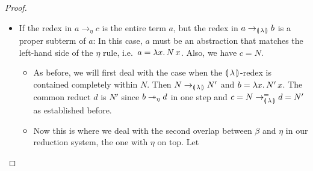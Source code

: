 \begin{proof}
\begin{itemize}
\begin{itemize}
\begin{itemize}
        $a = \ap{(\lam{x}{\ap{T}{x}})}{N}$. Performing the $\eta$-reduction
        yields $c = \ap{T}{N}$. In this case, both $b$ and $c$ are equal to
        $\ap{T}{N}$ and so we can choose $\ap{T}{N}$ as our $d$.
      \end{itemize}
    \item If $a$ is any other kind of term: Let $l \to r$ be the rule used
      in $a \to_{\calc} b$. Not counting $\beta$, which only acts on
      applications and which we dealt with just above, the rules of
      $\banana{\lambda}$ do not overlap with the $\eta$ rule. This
      means the $\eta$-redex which led to $c$ must lie entirely inside a
      part the part of $l$ which corresponds to a metavariable. Let $M$ be
      that metavariable, then we will decompose $l$ into $L(M)$ and $r$
      into $R(M)$. We have $a = L(a')$ for some $a'$, $b = R(a')$ and
      $c = L(a'')$\footnote{Since our rules are left-linear, $M$ is
        guaranteed to appear in $L(M)$ at most once. Therefore, if
        $a' \to_\eta a''$ in one step, then also $L(a') \to_\eta L(a'')$ in
        one step as well.}. Our $d$ will be $R(a'')$ and we have
      $b = R(a') \tto_\eta d = R(a'')$ in several steps\footnote{$a'$ can
        occur multiple times in $R(a')$ when the rule $l \to r$ is
        duplicating (which is actually the case for the $\banana{\op{op}}$
        rules). However, we are able to go from $R(a')$ to $R(a'')$ in
        multiple steps. NB: This is why we use
        Lemma~\ref{lem:commutativity} instead of trying to prove
        commutativity directly.} and $c = L(a'') \to_{\calc}^= d = R(a'')$
      in one step of $l \to r$.
    \end{itemize}
  \item If the redex in $a \to_\eta c$ is the entire term $a$, but the
    redex in $a \to_{\calc} b$ is a proper subterm of $a$: In this case,
    $a$ must be an abstraction that matches the left-hand side of the
    $\eta$ rule, i.e.\ $a = \lambda x.\, N\,x$. Also, we have $c = N$.
    \begin{itemize}
    \item As before, we will first deal with the case when the
      $\banana{\lambda}$-redex is contained completely within $N$. Then
      $N \to_{\llparenthesis \, \lambda \, \rrparenthesis} N'$ and $b = \lambda x.\, N'\,x$. The common reduct
      $d$ is $N'$ since $b \twoheadrightarrow_\eta d$ in one step and
      $c = N \to_{\llparenthesis \, \lambda \, \rrparenthesis}^= d = N'$ as established before.
    \item Now this is where we deal with the second overlap between $\beta$
      and $\eta$ in our reduction system, the one with $\eta$ on top. Let

\end{itemize}
\end{itemize}
\end{proof}
